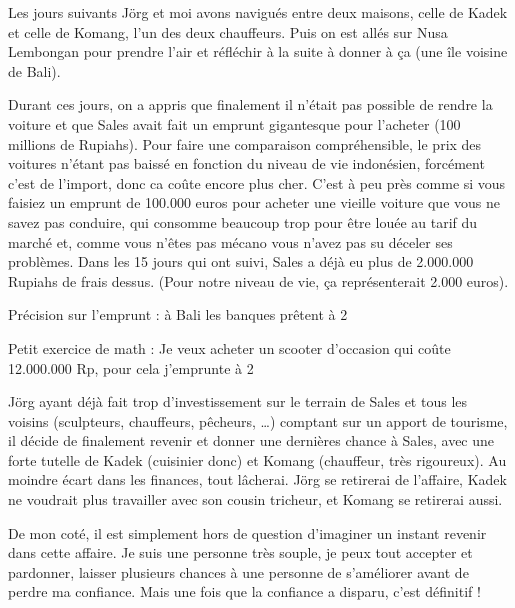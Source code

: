 Les jours suivants Jörg et moi avons navigués entre deux maisons, celle de Kadek et celle de Komang, l’un des deux chauffeurs. Puis on est allés sur Nusa Lembongan pour prendre l’air et réfléchir à la suite à donner à ça (une île voisine de Bali).

Durant ces jours, on a appris que finalement il n’était pas possible de rendre la voiture et que Sales avait fait un emprunt gigantesque pour l’acheter (100 millions de Rupiahs). Pour faire une comparaison compréhensible, le prix des voitures n’étant pas baissé en fonction du niveau de vie indonésien, forcément c’est de l’import, donc ca coûte encore plus cher. C’est à peu près comme si vous faisiez un emprunt de 100.000 euros pour acheter une vieille voiture que vous ne savez pas conduire, qui consomme beaucoup trop pour être louée au tarif du marché et, comme vous n’êtes pas mécano vous n’avez pas su déceler ses problèmes. Dans les 15 jours qui ont suivi, Sales a déjà eu plus de 2.000.000 Rupiahs de frais dessus. (Pour notre niveau de vie, ça représenterait 2.000 euros).

Précision sur l’emprunt : à Bali les banques prêtent à 2 %

Petit exercice de math : Je veux acheter un scooter d’occasion qui coûte 12.000.000 Rp, pour cela j’emprunte à 2%

Jörg ayant déjà fait trop d’investissement sur le terrain de Sales et tous les voisins (sculpteurs, chauffeurs, pêcheurs, …) comptant sur un apport de tourisme, il décide de finalement revenir et donner une dernières chance à Sales, avec une forte tutelle de Kadek (cuisinier donc) et Komang (chauffeur, très rigoureux). Au moindre écart dans les finances, tout lâcherai. Jörg se retirerai de l’affaire, Kadek ne voudrait plus travailler avec son cousin tricheur, et Komang se retirerai aussi.

De mon coté, il est simplement hors de question d’imaginer un instant revenir dans cette affaire. Je suis une personne très souple, je peux tout accepter et pardonner, laisser plusieurs chances à une personne de s’améliorer avant de perdre ma confiance. Mais une fois que la confiance a disparu, c’est définitif !

